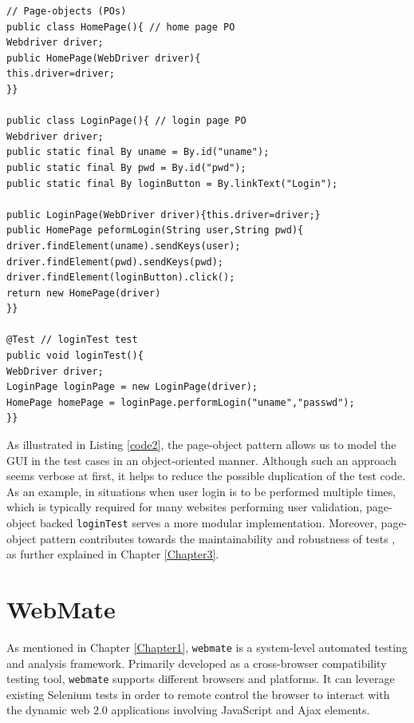\begin{center}
\begin{scriptsize}
\centering
\lstset{
  basicstyle=\ttfamily,
  columns=fullflexible,
  keepspaces=true,
}
  
\begin{lstlisting}[caption=Page-objects design for \texttt{loginTest},label=code2]
// Page-objects (POs)
public class HomePage(){ // home page PO
Webdriver driver;
public HomePage(WebDriver driver){
this.driver=driver;
}}

public class LoginPage(){ // login page PO
Webdriver driver;
public static final By uname = By.id("uname");
public static final By pwd = By.id("pwd");
public static final By loginButton = By.linkText("Login");

public LoginPage(WebDriver driver){this.driver=driver;}
public HomePage peformLogin(String user,String pwd){
driver.findElement(uname).sendKeys(user);
driver.findElement(pwd).sendKeys(pwd);
driver.findElement(loginButton).click();
return new HomePage(driver)
}}

@Test // loginTest test
public void loginTest(){
WebDriver driver;
LoginPage loginPage = new LoginPage(driver);
HomePage homePage = loginPage.performLogin("uname","passwd");
}}
\end{lstlisting}
\end{scriptsize} 
\end{center}
 
As illustrated in Listing \ref{code2}, the page-object pattern allows us to model the GUI in the test cases in an object-oriented manner. Although such an approach seems verbose at first, it helps to reduce the possible duplication of the test code. As an example, in situations when user login is to be performed multiple times, which is typically required for many websites performing user validation, page-object backed \texttt{loginTest} serves a more modular implementation. 
Moreover, page-object pattern contributes towards the maintainability and robustness of tests \cite{leottaPObs}, as further explained in Chapter \ref{Chapter3}.


\section{WebMate}
\label{sec:WebMate}
As mentioned in Chapter \ref{Chapter1}, \texttt{webmate} \cite{webmate} is a system-level automated testing and analysis framework. Primarily developed as a cross-browser compatibility testing tool, \texttt{webmate} supports different browsers and platforms. It can leverage existing Selenium tests in order to remote control the browser to interact with the dynamic web 2.0 applications involving JavaScript and Ajax elements. 

